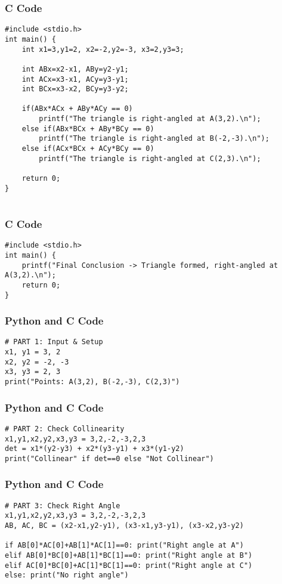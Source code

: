 \documentclass{beamer}
\begin{document}
\begin{frame}[fragile]
\frametitle{C Code}
\begin{lstlisting}
#include <stdio.h>
int main() {
    int x1=3,y1=2, x2=-2,y2=-3, x3=2,y3=3;

    int ABx=x2-x1, ABy=y2-y1;
    int ACx=x3-x1, ACy=y3-y1;
    int BCx=x3-x2, BCy=y3-y2;

    if(ABx*ACx + ABy*ACy == 0)
        printf("The triangle is right-angled at A(3,2).\n");
    else if(ABx*BCx + ABy*BCy == 0)
        printf("The triangle is right-angled at B(-2,-3).\n");
    else if(ACx*BCx + ACy*BCy == 0)
        printf("The triangle is right-angled at C(2,3).\n");

    return 0;
}


\end{lstlisting}

\end{frame}

\begin{frame}[fragile]
\frametitle{C Code}
\begin{lstlisting}
#include <stdio.h>
int main() {
    printf("Final Conclusion -> Triangle formed, right-angled at A(3,2).\n");
    return 0;
}

\end{lstlisting}

\end{frame}



    \begin{frame}[fragile]
\frametitle{Python and C Code}

\begin{lstlisting}
# PART 1: Input & Setup
x1, y1 = 3, 2
x2, y2 = -2, -3
x3, y3 = 2, 3
print("Points: A(3,2), B(-2,-3), C(2,3)")
\end{lstlisting}

\end{frame}

    \begin{frame}[fragile]
\frametitle{Python and C Code}

\begin{lstlisting}
# PART 2: Check Collinearity
x1,y1,x2,y2,x3,y3 = 3,2,-2,-3,2,3
det = x1*(y2-y3) + x2*(y3-y1) + x3*(y1-y2)
print("Collinear" if det==0 else "Not Collinear")

\end{lstlisting}

\end{frame}

    \begin{frame}[fragile]
\frametitle{Python and C Code}

\begin{lstlisting}
# PART 3: Check Right Angle
x1,y1,x2,y2,x3,y3 = 3,2,-2,-3,2,3
AB, AC, BC = (x2-x1,y2-y1), (x3-x1,y3-y1), (x3-x2,y3-y2)

if AB[0]*AC[0]+AB[1]*AC[1]==0: print("Right angle at A")
elif AB[0]*BC[0]+AB[1]*BC[1]==0: print("Right angle at B")
elif AC[0]*BC[0]+AC[1]*BC[1]==0: print("Right angle at C")
else: print("No right angle")
\end{lstlisting}

\end{frame}
\end{document}
